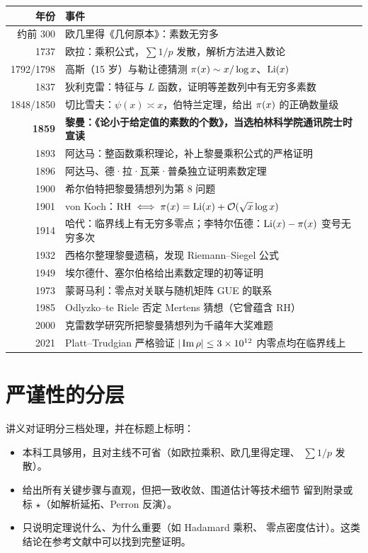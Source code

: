 \begin{center}\small
\begin{tabular}{rp{}}
\toprule
\textbf{年份} & \textbf{事件}\\
\midrule
约前 300 & 欧几里得《几何原本》：素数无穷多\\
1737 & 欧拉：乘积公式，$\sum 1/p$ 发散，解析方法进入数论\\
1792/1798 & 高斯（15 岁）与勒让德猜测 $\pi(x)\sim x/\log x$、$\operatorname{Li}(x)$\\
1837 & 狄利克雷：特征与 $L$ 函数，证明等差数列中有无穷多素数\\
1848/1850 & 切比雪夫：$\psi(x)\asymp x$，伯特兰定理，给出 $\pi(x)$ 的正确数量级\\
\textbf{1859} & \textbf{黎曼：《论小于给定值的素数的个数》，当选柏林科学院通讯院士时宣读}\\
1893 & 阿达马：整函数乘积理论，补上黎曼乘积公式的严格证明\\
1896 & 阿达马、德·拉·瓦莱·普桑独立证明素数定理\\
1900 & 希尔伯特把黎曼猜想列为第 8 问题\\
1901 & von Koch：$\mathrm{RH}\iff\pi(x)=\operatorname{Li}(x)+\mathcal{O}(\sqrt{x}\log x)$\\
1914 & 哈代：临界线上有无穷多零点；李特尔伍德：$\operatorname{Li}(x)-\pi(x)$ 变号无穷多次\\
1932 & 西格尔整理黎曼遗稿，发现 Riemann--Siegel 公式\\
1949 & 埃尔德什、塞尔伯格给出素数定理的初等证明\\
1973 & 蒙哥马利：零点对关联与随机矩阵 GUE 的联系\\
1985 & Odlyzko--te Riele 否定 Mertens 猜想（它曾蕴含 RH）\\
2000 & 克雷数学研究所把黎曼猜想列为千禧年大奖难题\\
2021 & Platt--Trudgian 严格验证 $|\operatorname{Im}\rho|\le 3\times 10^{12}$ 内零点均在临界线上\\
\bottomrule
\end{tabular}
\end{center}

\section{严谨性的分层}
\label{sec:00-rigor}

讲义对证明分三档处理，并在标题上标明：

\begin{itemize}[leftmargin=2em]
  \item[\textbf{完整证明}] 本科工具够用，且对主线不可省（如欧拉乘积、欧几里得定理、
        $\sum 1/p$ 发散）。
  \item[\textbf{结构证明}] 给出所有关键步骤与直观，但把一致收敛、围道估计等技术细节
        留到附录或标 $\star$（如解析延拓、Perron 反演）。
  \item[\textbf{陈述 + 解释}] 只说明定理说什么、为什么重要（如 Hadamard 乘积、
        零点密度估计）。这类结论在参考文献中可以找到完整证明。
\end{itemize}

